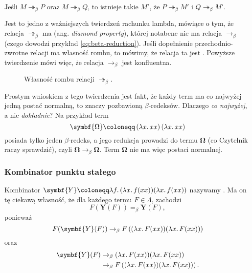 \documentclass[polish,pretty]{angav}
\newcommand{\toto}{\twoheadrightarrow}
\begin{document}
\begin{theorem}
    Jeśli $M \toto_\beta P$ oraz $M \toto_\beta Q$, to istnieje takie $M'$, że $P \toto_\beta M'$ i $Q \toto_\beta M'$.
\end{theorem}

Jest to jedno z ważniejszych twierdzeń rachunku lambda, mówiące o tym, że relacja $\toto_\beta$ ma  (ang. \textit{diamond property}), której notabene nie ma relacja $\to_\beta$ (czego dowodzi przykład \ref{eq:beta-reduction}). Jeśli dopełnienie przechodnio-zwrotne relacji ma własność rombu, to mówimy, że relacja ta jest . Powyższe twierdzenie mówi więc, że relacja $\to_\beta$ jest konfluentna.

\begin{figure}[H]
    \centering
    \caption{Własność rombu relacji $\toto_\beta$.}
    \label{fig:church-rosser}
\end{figure}

Prostym wnioskiem z tego twierdzenia jest fakt, że każdy term ma co najwyżej jedną postać normalną, to znaczy pozbawioną $\beta$-redeksów.
Dlaczego \emph{co najwyżej}, a nie \emph{dokładnie}? Na przykład term
\[ \symbf{\Omega} \coloneqq \left(\lambda x\ldotp xx\right)\left(\lambda x\ldotp xx\right) \]
posiada tylko jeden $\beta$-redeks, a jego redukcja prowadzi do termu $\symbf{\Omega}$ (co Czytelnik raczy sprawdzić), czyli $\symbf{\Omega} \to_\beta \symbf{\Omega}$. Term $\symbf{\Omega}$ nie ma więc postaci normalnej.

\subsubsection{Kombinator punktu stałego}
Kombinator $\symbf{Y} \coloneqq \lambda f\ldotp (\lambda x\ldotp f (xx)) (\lambda x\ldotp f (xx))$ nazywamy . Ma on tę ciekawą własność, że dla każdego termu $F \in \Lambda$, zachodzi
\[ F(\symbf{Y}(F)) =_\beta \symbf{Y}(F), \]
ponieważ
\[ F(\symbf{Y}(F)) \to_\beta F\left((\lambda x\ldotp F (xx)) (\lambda x\ldotp F (xx))\right) \]
oraz
\begin{align*}
    \symbf{Y}(F) &\to_\beta (\lambda x\ldotp F (xx)) (\lambda x\ldotp F (xx)) \\
    &\to_\beta F\left((\lambda x\ldotp F (xx)) (\lambda x\ldotp F (xx))\right).
\end{align*}
\end{document}
